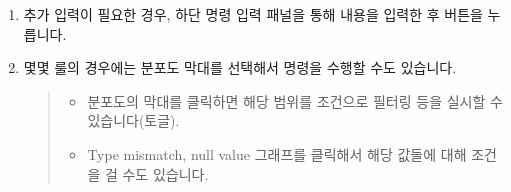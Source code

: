 \documentclass[letterpaper,10pt,english]{sphinxmanual}
\begin{document}
\begin{enumerate}
\item {} 
추가 입력이 필요한 경우, 하단 명령 입력 패널을 통해 내용을 입력한 후  버튼을 누릅니다.
\begin{quote}

\begin{figure}[H]
\centering

\noindent{}
\end{figure}
\end{quote}

\item {} 
몇몇 룰의 경우에는 분포도 막대를 선택해서 명령을 수행할 수도 있습니다.
\begin{quote}
\begin{itemize}
\item {} 
분포도의 막대를 클릭하면 해당 범위를 조건으로 필터링 등을 실시할 수 있습니다(토글).

\item {} 
Type mismatch, null value 그래프를 클릭해서 해당 값들에 대해 조건을 걸 수도 있습니다.

\end{itemize}

\begin{figure}[H]
\centering

\noindent{}
\end{figure}
\end{quote}

\end{enumerate}
\end{document}
